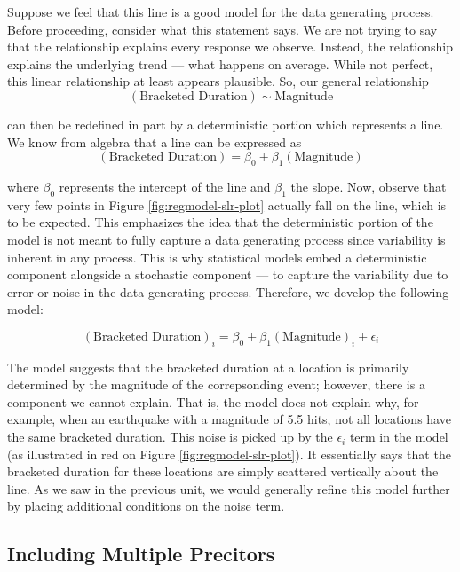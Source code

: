 \documentclass[]{book}
\theoremstyle{definition}
\theoremstyle{definition}
\theoremstyle{definition}
\theoremstyle{remark}
\begin{document}
Suppose we feel that this line is a good model for the data generating
process. Before proceeding, consider what this statement says. We are
not trying to say that the relationship explains every response we
observe. Instead, the relationship explains the underlying trend ---
what happens on average. While not perfect, this linear relationship at
least appears plausible. So, our general relationship
\[(\text{Bracketed Duration}) \sim \text{Magnitude}\]

can then be redefined in part by a deterministic portion which
represents a line. We know from algebra that a line can be expressed as
\[(\text{Bracketed Duration}) = \beta_0 + \beta_1 (\text{Magnitude})\]

where \(\beta_0\) represents the intercept of the line and \(\beta_1\)
the slope. Now, observe that very few points in Figure
\ref{fig:regmodel-slr-plot} actually fall on the line, which is to be
expected. This emphasizes the idea that the deterministic portion of the
model is not meant to fully capture a data generating process since
variability is inherent in any process. This is why statistical models
embed a deterministic component alongside a stochastic component --- to
capture the variability due to error or noise in the data generating
process. Therefore, we develop the following model:

\begin{equation}
  (\text{Bracketed Duration})_i = \beta_0 + \beta_1(\text{Magnitude})_i + \epsilon_i
  \label{eq:regmodel-slr}
\end{equation}

The model suggests that the bracketed duration at a location is
primarily determined by the magnitude of the correpsonding event;
however, there is a component we cannot explain. That is, the model does
not explain why, for example, when an earthquake with a magnitude of 5.5
hits, not all locations have the same bracketed duration. This noise is
picked up by the \(\epsilon_i\) term in the model (as illustrated in red
on Figure \ref{fig:regmodel-slr-plot}). It essentially says that the
bracketed duration for these locations are simply scattered vertically
about the line. As we saw in the previous unit, we would generally
refine this model further by placing additional conditions on the noise
term.

\subsection{Including Multiple
Precitors}\label{including-multiple-precitors}
\end{document}
